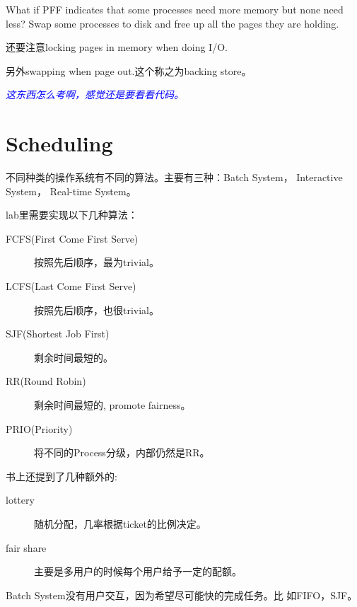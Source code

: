 \documentclass[a4paper]{article}
\newcommand{\problem}[1]{\textcolor{blue}{\textit{#1}}}
\begin{document}
 What if PFF indicates that some
processes need more memory but none
need less?
Swap some processes to disk and free
up all the pages they are holding.

还要注意locking pages in memory when doing I/O.

另外swapping when page out.这个称之为backing store。

\problem{这东西怎么考啊，感觉还是要看看代码。}

\section{Scheduling}
不同种类的操作系统有不同的算法。主要有三种：Batch System， Interactive System，
Real-time System。

lab里需要实现以下几种算法：
\begin{description}
\item[FCFS(First Come First Serve)]{按照先后顺序，最为trivial。} 
\item[LCFS(Last Come First Serve)]{按照先后顺序，也很trivial。} 
\item[SJF(Shortest Job First)]{剩余时间最短的。} 
\item[RR(Round Robin)]{剩余时间最短的, promote fairness。} 
\item[PRIO(Priority)]{将不同的Process分级，内部仍然是RR。} 
\end{description}

书上还提到了几种额外的:
\begin{description}
\item[lottery]{随机分配，几率根据ticket的比例决定。} 
\item[fair share]{主要是多用户的时候每个用户给予一定的配额。} 
\end{description}
Batch System没有用户交互，因为希望尽可能快的完成任务。比
如FIFO，SJF。
\nocite{*}
% 
\end{document}
